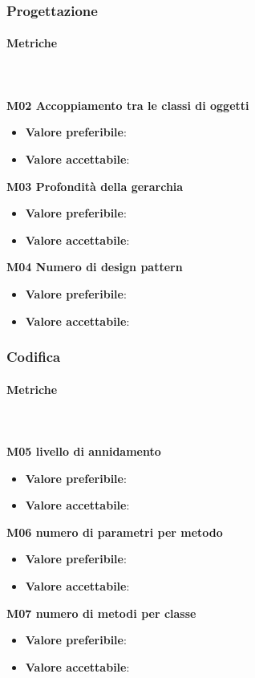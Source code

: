		\subsubsection{Progettazione} 
			\paragraph{Metriche} \mbox{} \\ \\
				\textbf{M02 Accoppiamento tra le classi di oggetti} 
				\begin{itemize}
					\item \textbf{Valore preferibile}:
					\item \textbf{Valore accettabile}: 
				\end{itemize}
				\textbf{M03 Profondità della gerarchia} 
				\begin{itemize}
					\item \textbf{Valore preferibile}:
					\item \textbf{Valore accettabile}: 
				\end{itemize}			
				\textbf{M04 Numero di design pattern} 
				\begin{itemize}
					\item \textbf{Valore preferibile}:
					\item \textbf{Valore accettabile}: 
				\end{itemize}
			
			\subsubsection{Codifica} 
			\paragraph{Metriche} \mbox{} \\ \\
			\textbf{M05 livello di annidamento} 
			\begin{itemize}
				\item \textbf{Valore preferibile}:
				\item \textbf{Valore accettabile}: 
			\end{itemize}
			\textbf{M06 numero di parametri per metodo} 
			\begin{itemize}
				\item \textbf{Valore preferibile}:
				\item \textbf{Valore accettabile}: 
			\end{itemize}			
			\textbf{M07 numero di metodi per classe} 
			\begin{itemize}
				\item \textbf{Valore preferibile}:
				\item \textbf{Valore accettabile}: 
			\end{itemize}
	
